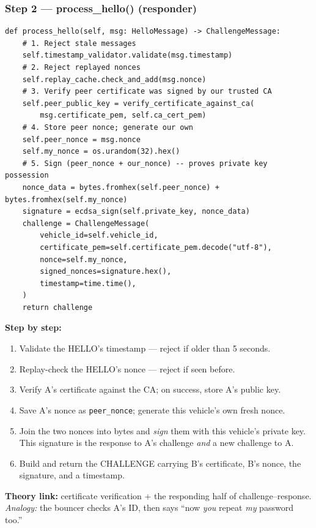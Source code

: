 \documentclass[11pt,a4paper]{article}
\begin{document}
\subsubsection*{Step 2 --- process\_hello() (responder)}
\begin{lstlisting}[style=py,caption={auth\_protocol.py --- Step 2: verify HELLO, build CHALLENGE.}]
def process_hello(self, msg: HelloMessage) -> ChallengeMessage:
    # 1. Reject stale messages
    self.timestamp_validator.validate(msg.timestamp)
    # 2. Reject replayed nonces
    self.replay_cache.check_and_add(msg.nonce)
    # 3. Verify peer certificate was signed by our trusted CA
    self.peer_public_key = verify_certificate_against_ca(
        msg.certificate_pem, self.ca_cert_pem)
    # 4. Store peer nonce; generate our own
    self.peer_nonce = msg.nonce
    self.my_nonce = os.urandom(32).hex()
    # 5. Sign (peer_nonce + our_nonce) -- proves private key possession
    nonce_data = bytes.fromhex(self.peer_nonce) + bytes.fromhex(self.my_nonce)
    signature = ecdsa_sign(self.private_key, nonce_data)
    challenge = ChallengeMessage(
        vehicle_id=self.vehicle_id,
        certificate_pem=self.certificate_pem.decode("utf-8"),
        nonce=self.my_nonce,
        signed_nonces=signature.hex(),
        timestamp=time.time(),
    )
    return challenge
\end{lstlisting}
\textbf{Step by step:}
\begin{enumerate}
  \item Validate the HELLO's timestamp --- reject if older than 5 seconds.
  \item Replay-check the HELLO's nonce --- reject if seen before.
  \item Verify A's certificate against the CA; on success, store A's public key.
  \item Save A's nonce as \texttt{peer\_nonce}; generate this vehicle's own fresh
        nonce.
  \item Join the two nonces into bytes and \emph{sign} them with this vehicle's
        private key. This signature is the response to A's challenge \emph{and}
        a new challenge to A.
  \item Build and return the CHALLENGE carrying B's certificate, B's nonce, the
        signature, and a timestamp.
\end{enumerate}
\textbf{Theory link:} certificate verification + the responding half of
challenge--response. \emph{Analogy:} the bouncer checks A's ID, then says ``now
\emph{you} repeat \emph{my} password too.''
\end{document}
